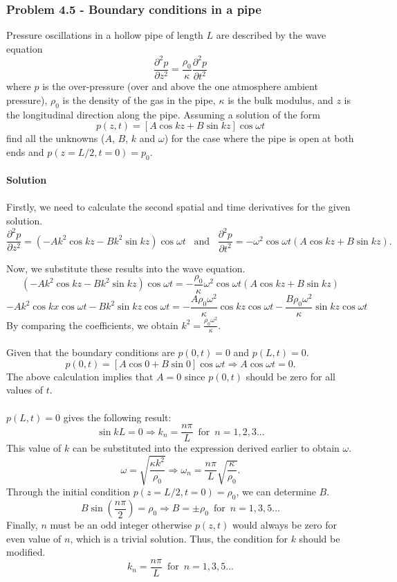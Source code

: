 \documentclass[12pt,a4paper]{article}
\begin{document}
\subsubsection*{Problem 4.5 - Boundary conditions in a pipe}
Pressure oscillations in a hollow pipe of length $L$ are described by the wave equation
\[\frac{\partial^2p}{\partial z^2}=\frac{\rho_0}{\kappa}\frac{\partial^2p}{\partial t^2}\]
where $p$ is the over-pressure (over and above the one atmosphere ambient pressure), $\rho_0$ is the density of the gas in the pipe, $\kappa$ is the bulk modulus, and $z$ is the longitudinal direction along the pipe. Assuming a solution of the form
\[p(z,t)=[A\cos kz + B\sin kz]\cos\omega t\]
find all the unknowns ($A$, $B$, $k$ and $\omega$) for the case where the pipe is open at both ends and $p(z=L/2,t=0)=p_0$.
\\
\\\textbf{Solution}
\\
\\Firstly, we need to calculate the second spatial and time derivatives for the given solution.
\[\frac{\partial^2 p}{\partial z^2}=\left(-Ak^2\cos kz-Bk^2\sin kz\right)\cos\omega t\,\,\,\,\,\text{and}\,\,\,\,\,\frac{\partial^2 p}{\partial t^2}=-\omega^2\cos\omega t\left(A\cos kz + B\sin kz\right).\]

Now, we substitute these results into the wave equation.
\[\left(-Ak^2\cos kz-Bk^2\sin kz\right)\cos\omega t=-\frac{\rho_0}{\kappa}\omega^2\cos\omega t\left(A\cos kz + B\sin kz\right)\]
\[-Ak^2\cos kx\cos\omega t-Bk^2\sin kz\cos\omega t=-\frac{A\rho_0\omega^2}{\kappa}\cos kz\cos\omega t-\frac{B\rho_0\omega^2}{\kappa}\sin kz\cos\omega t\]
By comparing the coefficients, we obtain $k^2=\frac{\rho_0\omega^2}{\kappa}$.
\\
\\Given that the boundary conditions are $p(0,t)=0$ and $p(L,t)=0$.
\[p(0,t)=[A\cos0+B\sin0]\cos\omega t\Rightarrow A\cos\omega t=0.\]
The above calculation implies that $A=0$ since $p(0,t)$ should be zero for all values of $t$.
\\
\\$p(L,t)=0$ gives the following result:
\[\sin kL=0\Rightarrow k_n=\frac{n\pi}{L}\,\,\,\text{for}\,\,\,n=1,2,3...\]
This value of $k$ can be substituted into the expression derived earlier to obtain $\omega$.
\[\omega=\sqrt{\frac{\kappa k^2}{\rho_0}}\Rightarrow\omega_n=\frac{n\pi}{L}\sqrt{\frac{\kappa}{\rho_0}}.\]
Through the initial condition $p(z=L/2,t=0)=\rho_0$, we can determine $B$.
\[B\sin\left(\frac{n\pi}{2}\right)=\rho_0\Rightarrow B=\pm\rho_0\,\,\,\text{for}\,\,\,n=1,3,5...\]
Finally, $n$ must be an odd integer otherwise $p(z,t)$ would always be zero for even value of $n$, which is a trivial solution. Thus, the condition for $k$ should be modified. \[k_n=\frac{n\pi}{L}\,\,\,\text{for}\,\,\,n=1,3,5...\]
\end{document}
